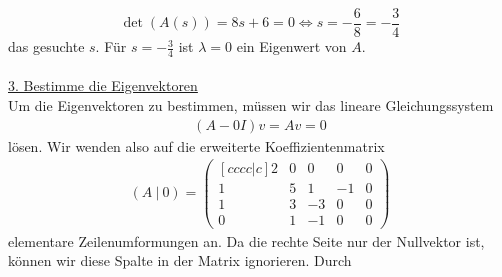 \begin{equation*}
\det(A(s)) = 8s +6 = 0
\Leftrightarrow
s = -\frac{6}{8} = -\frac{3}{4}
\end{equation*}
das gesuchte $s$.
Für $s = -\frac{3}{4}$ ist $\lambda = 0$ ein Eigenwert von $A$.
\\
\\
\underline{3. Bestimme die Eigenvektoren}\\
Um die Eigenvektoren zu bestimmen, müssen wir das lineare Gleichungssystem
\begin{align*}
(A - 0 I) v = A v = 0
\end{align*}
lösen.
Wir wenden also auf die erweiterte Koeffizientenmatrix
\begin{align*}
(A \  | \ 0 ) =
\begin{pmatrix}[cccc|c]
2 & 0 &0 & 0 & 0 \\
1 & 5 & 1  & -1 & 0\\
1 & 3 & -3 & 0 & 0  \\
0 & 1 & -1 & 0 & 0
\end{pmatrix}
\end{align*}
elementare Zeilenumformungen an.
Da die rechte Seite nur der Nullvektor ist, können wir diese Spalte in der Matrix ignorieren.
Durch

